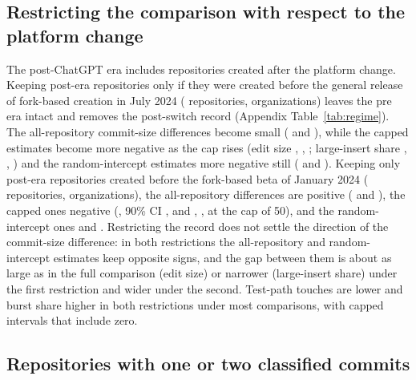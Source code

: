 \documentclass[acmsmall,screen,review,anonymous]{acmart}
\begin{document}
\subsection{Restricting the comparison with respect to the platform change}
\label{sec:restricted}

The post-ChatGPT era includes repositories created after the platform change. Keeping post-era repositories only if they were created before the general release of fork-based creation in July 2024 ( repositories,  organizations) leaves the pre era intact and removes the post-switch record (Appendix Table~\ref{tab:regime}). The all-repository commit-size differences become small ( and ), while the capped estimates become more negative as the cap rises (edit size , , ; large-insert share , , ) and the random-intercept estimates more negative still ( and ). Keeping only post-era repositories created before the fork-based beta of January 2024 ( repositories,  organizations), the all-repository differences are positive ( and ), the capped ones negative (, 90\% CI , and , , at the cap of 50), and the random-intercept ones  and . Restricting the record does not settle the direction of the commit-size difference: in both restrictions the all-repository and random-intercept estimates keep opposite signs, and the gap between them is about as large as in the full comparison (edit size) or narrower (large-insert share) under the first restriction and wider under the second. Test-path touches are lower and burst share higher in both restrictions under most comparisons, with capped intervals that include zero.

\subsection{Repositories with one or two classified commits}
\label{sec:lowcommit}
\end{document}
